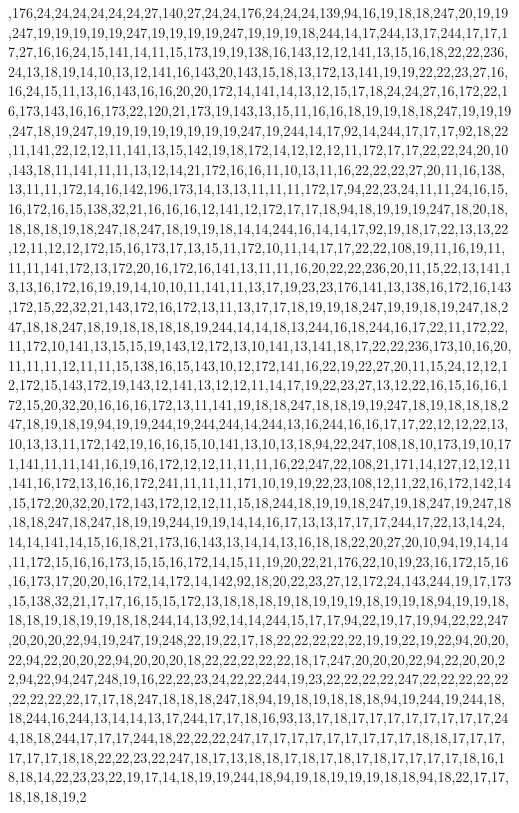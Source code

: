 ,176,24,24,24,24,24,24,27,140,27,24,24,176,24,24,24,139,94,16,19,18,18,247,20,19,19,247,19,19,19,19,19,247,19,19,19,19,247,19,19,19,18,244,14,17,244,13,17,244,17,17,17,27,16,16,24,15,141,14,11,15,173,19,19,138,16,143,12,12,141,13,15,16,18,22,22,236,24,13,18,19,14,10,13,12,141,16,143,20,143,15,18,13,172,13,141,19,19,22,22,23,27,16,16,24,15,11,13,16,143,16,16,20,20,172,14,141,14,13,12,15,17,18,24,24,27,16,172,22,16,173,143,16,16,173,22,120,21,173,19,143,13,15,11,16,16,18,19,19,18,18,247,19,19,19,247,18,19,247,19,19,19,19,19,19,19,19,247,19,244,14,17,92,14,244,17,17,17,92,18,22,11,141,22,12,12,11,141,13,15,142,19,18,172,14,12,12,12,11,172,17,17,22,22,24,20,10,143,18,11,141,11,11,13,12,14,21,172,16,16,11,10,13,11,16,22,22,22,27,20,11,16,138,13,11,11,172,14,16,142,196,173,14,13,13,11,11,11,172,17,94,22,23,24,11,11,24,16,15,16,172,16,15,138,32,21,16,16,16,12,141,12,172,17,17,18,94,18,19,19,19,247,18,20,18,18,18,18,19,18,247,18,247,18,19,19,18,14,14,244,16,14,14,17,92,19,18,17,22,13,13,22,12,11,12,12,172,15,16,173,17,13,15,11,172,10,11,14,17,17,22,22,108,19,11,16,19,11,11,11,141,172,13,172,20,16,172,16,141,13,11,11,16,20,22,22,236,20,11,15,22,13,141,13,13,16,172,16,19,19,14,10,10,11,141,11,13,17,19,23,23,176,141,13,138,16,172,16,143,172,15,22,32,21,143,172,16,172,13,11,13,17,17,18,19,19,18,247,19,19,18,19,247,18,247,18,18,247,18,19,18,18,18,18,19,244,14,14,18,13,244,16,18,244,16,17,22,11,172,22,11,172,10,141,13,15,15,19,143,12,172,13,10,141,13,141,18,17,22,22,236,173,10,16,20,11,11,11,12,11,11,15,138,16,15,143,10,12,172,141,16,22,19,22,27,20,11,15,24,12,12,12,172,15,143,172,19,143,12,141,13,12,12,11,14,17,19,22,23,27,13,12,22,16,15,16,16,172,15,20,32,20,16,16,16,172,13,11,141,19,18,18,247,18,18,19,19,247,18,19,18,18,18,247,18,19,18,19,94,19,19,244,19,244,244,14,244,13,16,244,16,16,17,17,22,12,12,22,13,10,13,13,11,172,142,19,16,16,15,10,141,13,10,13,18,94,22,247,108,18,10,173,19,10,171,141,11,11,141,16,19,16,172,12,12,11,11,11,16,22,247,22,108,21,171,14,127,12,12,11,141,16,172,13,16,16,172,241,11,11,11,171,10,19,19,22,23,108,12,11,22,16,172,142,14,15,172,20,32,20,172,143,172,12,12,11,15,18,244,18,19,19,18,247,19,18,247,19,247,18,18,18,247,18,247,18,19,19,244,19,19,14,14,16,17,13,13,17,17,17,244,17,22,13,14,24,14,14,141,14,15,16,18,21,173,16,143,13,14,14,13,16,18,18,22,20,27,20,10,94,19,14,14,11,172,15,16,16,173,15,15,16,172,14,15,11,19,20,22,21,176,22,10,19,23,16,172,15,16,16,173,17,20,20,16,172,14,172,14,142,92,18,20,22,23,27,12,172,24,143,244,19,17,173,15,138,32,21,17,17,16,15,15,172,13,18,18,18,19,18,19,19,19,18,19,19,18,94,19,19,18,18,18,19,18,19,19,18,18,244,14,13,92,14,14,244,15,17,17,94,22,19,17,19,94,22,22,247,20,20,20,22,94,19,247,19,248,22,19,22,17,18,22,22,22,22,22,19,19,22,19,22,94,20,20,22,94,22,20,20,22,94,20,20,20,18,22,22,22,22,22,18,17,247,20,20,20,22,94,22,20,20,22,94,22,94,247,248,19,16,22,22,23,24,22,22,244,19,23,22,22,22,22,247,22,22,22,22,22,22,22,22,22,17,17,18,247,18,18,18,247,18,94,19,18,19,18,18,18,94,19,244,19,244,18,18,244,16,244,13,14,14,13,17,244,17,17,18,16,93,13,17,18,17,17,17,17,17,17,17,17,244,18,18,244,17,17,17,244,18,22,22,22,247,17,17,17,17,17,17,17,17,17,18,18,17,17,17,17,17,17,18,18,22,22,23,22,247,18,17,13,18,18,17,18,17,18,17,18,17,17,17,17,18,16,18,18,14,22,23,23,22,19,17,14,18,19,19,244,18,94,19,18,19,19,19,18,18,94,18,22,17,17,18,18,18,19,2